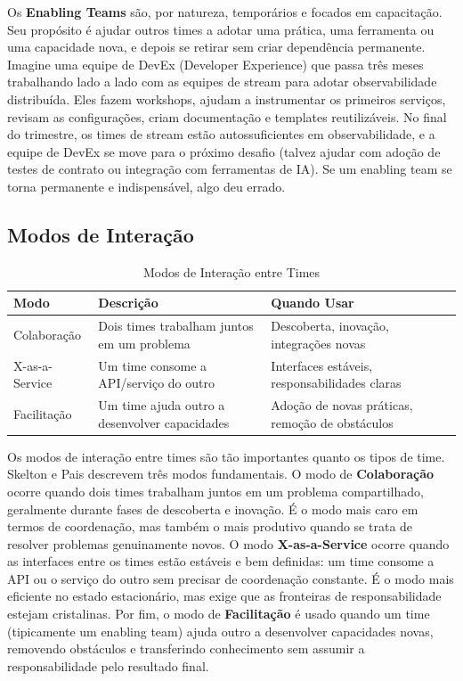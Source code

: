 Os \textbf{Enabling Teams} são, por natureza, temporários e focados em
capacitação. Seu propósito é ajudar outros times a adotar uma prática, uma
ferramenta ou uma capacidade nova, e depois se retirar sem criar dependência
permanente. Imagine uma equipe de DevEx (Developer Experience) que passa três
meses trabalhando lado a lado com as equipes de stream para adotar
observabilidade distribuída. Eles fazem workshops, ajudam a instrumentar os
primeiros serviços, revisam as configurações, criam documentação e templates
reutilizáveis. No final do trimestre, os times de stream estão autossuficientes
em observabilidade, e a equipe de DevEx se move para o próximo desafio (talvez
ajudar com adoção de testes de contrato ou integração com ferramentas de IA).
Se um enabling team se torna permanente e indispensável, algo deu errado.

\subsection{Modos de Interação}

\begin{table}[htbp]
\centering
\caption{Modos de Interação entre Times}
\begin{tabular}{|p{3cm}|p{5cm}|p{5cm}|}
\hline
\textbf{Modo} & \textbf{Descrição} & \textbf{Quando Usar} \\
\hline
Colaboração & Dois times trabalham juntos em um problema & Descoberta, inovação, integrações novas \\
\hline
X-as-a-Service & Um time consome a API/serviço do outro & Interfaces estáveis, responsabilidades claras \\
\hline
Facilitação & Um time ajuda outro a desenvolver capacidades & Adoção de novas práticas, remoção de obstáculos \\
\hline
\end{tabular}
\end{table}

Os modos de interação entre times são tão importantes quanto os tipos de time.
Skelton e Pais descrevem três modos fundamentais. O modo de \textbf{Colaboração}
ocorre quando dois times trabalham juntos em um problema compartilhado, geralmente
durante fases de descoberta e inovação. É o modo mais caro em termos de
coordenação, mas também o mais produtivo quando se trata de resolver problemas
genuinamente novos. O modo \textbf{X-as-a-Service} ocorre quando as interfaces
entre os times estão estáveis e bem definidas: um time consome a API ou o
serviço do outro sem precisar de coordenação constante. É o modo mais
eficiente no estado estacionário, mas exige que as fronteiras de
responsabilidade estejam cristalinas. Por fim, o modo de \textbf{Facilitação}
é usado quando um time (tipicamente um enabling team) ajuda outro a
desenvolver capacidades novas, removendo obstáculos e transferindo conhecimento
sem assumir a responsabilidade pelo resultado final.

